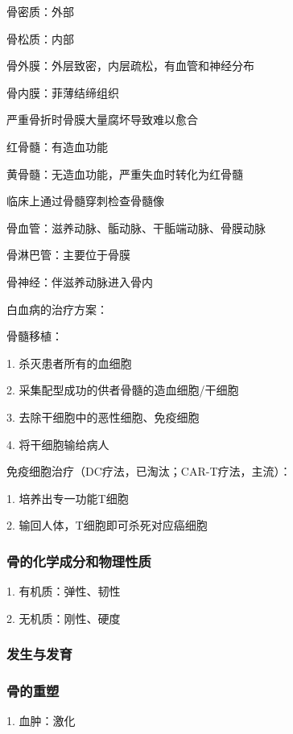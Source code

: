 \begin{notation}    
    骨密质：外部
    
    骨松质：内部
\end{notation}
\begin{notation}
    骨外膜：外层致密，内层疏松，有血管和神经分布

    骨内膜：菲薄结缔组织

    严重骨折时骨膜大量腐坏导致难以愈合
\end{notation}
\begin{notation}
    红骨髓：有造血功能

    黄骨髓：无造血功能，严重失血时转化为红骨髓

    临床上通过骨髓穿刺检查骨髓像
\end{notation}

\begin{notation}
    骨血管：滋养动脉、骺动脉、干骺端动脉、骨膜动脉

    骨淋巴管：主要位于骨膜

    骨神经：伴滋养动脉进入骨内
\end{notation}

\begin{notation}
    白血病的治疗方案：
    
    骨髓移植：

    1. 杀灭患者所有的血细胞

    2. 采集配型成功的供者骨髓的造血细胞/干细胞

    3. 去除干细胞中的恶性细胞、免疫细胞

    4. 将干细胞输给病人

    免疫细胞治疗（DC疗法，已淘汰；CAR-T疗法，主流）：
    
    1. 培养出专一功能T细胞

    2. 输回人体，T细胞即可杀死对应癌细胞
\end{notation}
\subsubsection*{骨的化学成分和物理性质}%
\label{subsub:骨的化学成分和物理性质}
1. 有机质：弹性、韧性

2. 无机质：刚性、硬度

\subsubsection*{发生与发育}%
\label{subsub:发生与发育}

\subsubsection*{骨的重塑}%
\label{subsub:骨的重塑}
1. 血肿：激化

